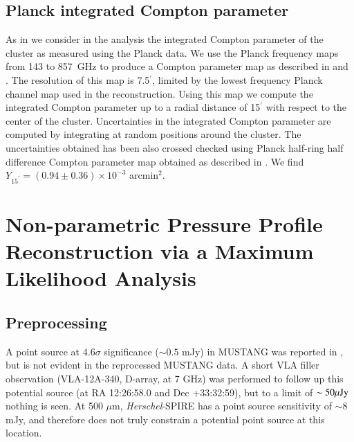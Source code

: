 \documentclass[twocolumn,traditabstract]{aa}
\begin{document}

\subsection{Planck integrated Compton parameter}
\label{sec:picp}

As in \citet{adam2015} we consider in the analysis the integrated Compton parameter of the cluster as measured using the Planck data.
We use the Planck frequency maps from 143 to 857~GHz to produce a Compton parameter map as described in \citet{hurier2013} and
\citet{planck2013ymap,2016A&A...594A..22P}. The resolution of this map is 7.5$^{\prime}$, limited by the lowest frequency Planck channel
map used in the reconstruction. Using this map we compute the integrated Compton parameter up to a radial distance of 15$^{\prime}$ with
respect to the center of the cluster. Uncertainties in the integrated Compton parameter are computed by integrating at random positions
around the cluster. The uncertainties obtained has been also crossed checked using Planck half-ring half difference Compton parameter
map
obtained as described in \citet{planck2013ymap,2016A&A...594A..22P}. We find $Y_{15^{\prime}} = (0.94 \pm 0.36) \times 10^{-3}$ arcmin$^2$. 


\section{Non-parametric Pressure Profile Reconstruction via a Maximum Likelihood Analysis}
\label{sec:ml_deproj}


\subsection{Preprocessing}
\label{sec:preprocessing}


A point source at $4.6\sigma$ significance ($\sim 0.5$ mJy) in MUSTANG was reported in \citet{korngut2011}, but is not
evident in the reprocessed MUSTANG data. A short VLA filler observation (VLA-12A-340, D-array, at 7 GHz) was performed
to follow up this potential source (at RA 12:26:58.0 and Dec +33:32:59), but to a limit of $\sim 50 {\rm \mu Jy}$ nothing
is seen. At 500 $\mu$m, \emph{Herschel}-SPIRE has a point source sensitivity of $\sim 8$ mJy, and therefore does not truly
constrain a potential point source at this location.
\end{document}

